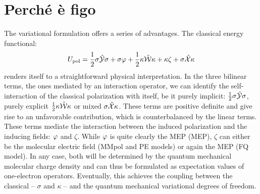 \section{Perché è figo}

The variational formulation offers a series of advantages.
The classical energy functional:
\begin{equation}
  U_\mathrm{pol} =
   \frac{1}{2}\sigma\hat{\mathcal{Y}}\sigma + \sigma\varphi
 + \frac{1}{2}\kappa\hat{\mathcal{W}}\kappa + \kappa\zeta
 + \sigma\hat{\mathcal{X}}\kappa
\end{equation}
renders itself to a straightforward physical interpretation. In the
three bilinear terms, \ie{} the ones mediated by an interaction
operator, we can identify the self-interaction of the classical
polarization with itself, be it purely implicit:
$\frac{1}{2}\sigma\hat{\mathcal{Y}}\sigma$, purely explicit
$\frac{1}{2}\kappa\hat{\mathcal{W}}\kappa$ or mixed $\sigma\hat{\mathcal{X}}\kappa$.
These terms are positive definite and give rise to an unfavorable
contribution, which is counterbalanced by the linear terms. These terms
mediate the interaction between the induced polarization and the
inducing fields: $\varphi$ and $\zeta$. While $\varphi$ is quite clearly the
\acl{MEP} (\acs{MEP}), $\zeta$ can either be the molecular electric
field (MMpol and PE models) or again the \acs{MEP} (FQ model).
In any case, both will be determined by the quantum mechanical molecular
charge density and can thus be formulated as expectation values of
one-electron operators. Eventually, this achieves the coupling between
the classical -- $\sigma$ and $\kappa$ -- and
the quantum mechanical variational degrees of freedom.

